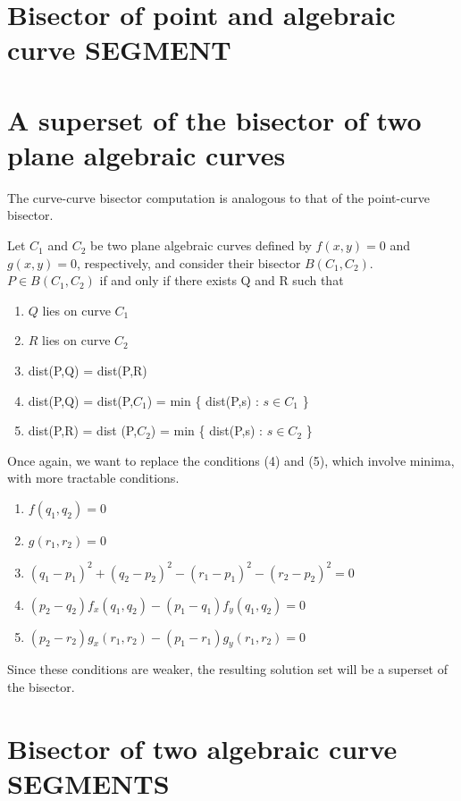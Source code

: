 \section{Bisector of point and algebraic curve SEGMENT}

\section{A superset of the bisector of two plane algebraic curves}
\label{sec-sup2}


The curve-curve bisector computation is analogous to that of the point-curve bisector.

Let $C_{1}$ and $C_{2}$ be two plane algebraic curves defined by $f(x,y)=0$ 
and $g(x,y)=0$, respectively, and consider their bisector $B(C_{1},C_{2})$.
$P \in B(C_{1},C_{2})$ if and only if there exists Q and R such that
\begin{enumerate}
\item
	$Q$ lies on curve $C_{1}$
\item
	$R$ lies on curve $C_{2}$
\item
	dist(P,Q) = dist(P,R)
\item
	dist(P,Q) = dist(P,$C_{1}$) = min \{ dist(P,s) : $s \in C_{1}$ \}
\item
	dist(P,R) = dist (P,$C_{2}$) = min \{ dist(P,s) : $s \in C_{2}$ \}
\end{enumerate} 
Once again, we want to replace the conditions (4) and (5), 
which involve minima, with more tractable conditions.

\begin{enumerate}
\item
	$f(q_{1},q_{2})=0$
\item
	$g(r_{1},r_{2})=0$
\item
	$(q_{1} - p_{1})^{2} + (q_{2} - p_{2})^{2} - (r_{1} - p_{1})^{2} - 
	(r_{2} - p_{2})^{2} = 0$
\item
	$(p_{2} - q_{2}) f_{x}(q_{1},q_{2}) - 
	(p_{1} - q_{1}) f_{y}(q_{1},q_{2}) = 0$
\item
	$(p_{2} - r_{2}) g_{x}(r_{1},r_{2}) - 
	(p_{1} - r_{1}) g_{y}(r_{1},r_{2}) = 0$
\end{enumerate}

Since these conditions are weaker, the resulting solution set will be a 
superset of the bisector.

\section{Bisector of two algebraic curve SEGMENTS}

